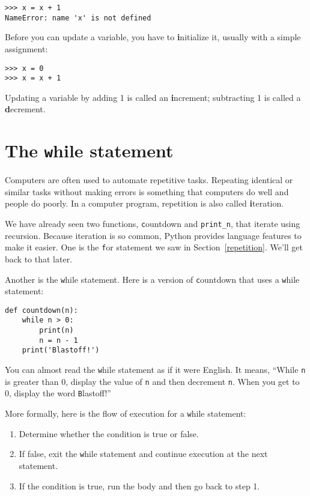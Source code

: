 \documentclass[
DIV=11,
fontsize=12,
twoside,
headinclude=false,
titlepage=firstiscover,
abstract=true,
headsepline=true,
footsepline=true,
chapterprefix=true, %
headings=big,
bibliography=totoc,%
captions=tableheading
]{scrbook}
\theoremstyle{definition}
\begin{document}
\begin{lstlisting}
>>> x = x + 1
NameError: name 'x' is not defined
\end{lstlisting}
%
Before you can update a variable, you have to {\textbf initialize}
it, usually with a simple assignment:

\begin{lstlisting}
>>> x = 0
>>> x = x + 1
\end{lstlisting}
%
Updating a variable by adding 1 is called an {\textbf increment};
subtracting 1 is called a {\textbf decrement}.




\section{The {\texttt while} statement}

Computers are often used to automate repetitive tasks.  Repeating
identical or similar tasks without making errors is something that
computers do well and people do poorly.  In a computer program,
repetition is also called {\textbf iteration}.

We have already seen two functions, {\texttt countdown} and
\verb"print_n", that iterate using recursion.  Because iteration is so
common, Python provides language features to make it easier.
One is the {\texttt for} statement we saw in Section~\ref{repetition}.
We'll get back to that later.

Another is the {\texttt while} statement.  Here is a version of {\texttt
countdown} that uses a {\texttt while} statement:

\begin{lstlisting}
def countdown(n):
    while n > 0:
        print(n)
        n = n - 1
    print('Blastoff!')
\end{lstlisting}
%
You can almost read the {\texttt while} statement as if it were English.
It means, ``While {\texttt n} is greater than 0,
display the value of {\texttt n} and then decrement
{\texttt n}.  When you get to 0, display the word {\texttt Blastoff!}''

More formally, here is the flow of execution for a {\texttt while} statement:

\begin{enumerate}

\item Determine whether the condition is true or false.

\item If false, exit the {\texttt while} statement
and continue execution at the next statement.

\item If the condition is true, run the
body and then go back to step 1.

\end{enumerate}
\end{document}
